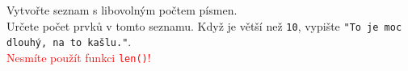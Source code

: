 \question[50]
Vytvořte seznam s libovolným počtem písmen.\\
Určete počet prvků v tomto seznamu. Když je větší než \texttt{10}, vypište
\texttt{"To je moc dlouhý, na to kašlu."}.\\
\textcolor{red}{Nesmíte použít funkci \texttt{len()}!}\\